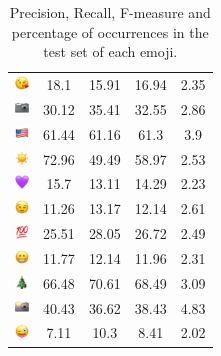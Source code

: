 \documentclass{article}
\begin{document}
\begin{table}
\begin{tabular}{|c|ccc|c|}
\includegraphics[height=0.37cm,width=0.37cm]{img/face_blowing_a_kiss.png} & 18.1 & 15.91 & 16.94 & 2.35\\ 
\includegraphics[height=0.37cm,width=0.37cm]{img/camera.png} & 30.12 & 35.41 & 32.55 & 2.86\\ 
\includegraphics[height=0.37cm,width=0.37cm]{img/United_States.png} & 61.44 & 61.16 & 61.3 & 3.9\\ 
\includegraphics[height=0.37cm,width=0.37cm]{img/sun.png} & 72.96 & 49.49 & 58.97 & 2.53\\ 
\includegraphics[height=0.37cm,width=0.37cm]{img/purple_heart.png} & 15.7 & 13.11 & 14.29 & 2.23\\ 
\includegraphics[height=0.37cm,width=0.37cm]{img/winking_face.png} & 11.26 & 13.17 & 12.14 & 2.61\\ 
\includegraphics[height=0.37cm,width=0.37cm]{img/hundred_points.png} & 25.51 & 28.05 & 26.72 & 2.49\\ 
\includegraphics[height=0.37cm,width=0.37cm]{img/beaming_face_with_smiling_eyes.png} & 11.77 & 12.14 & 11.96 & 2.31\\ 
\includegraphics[height=0.37cm,width=0.37cm]{img/Christmas_tree.png} & 66.48 & 70.61 & 68.49 & 3.09\\ 
\includegraphics[height=0.37cm,width=0.37cm]{img/camera_with_flash.png} & 40.43 & 36.62 & 38.43 & 4.83\\ 
\includegraphics[height=0.37cm,width=0.37cm]{img/winking_face_with_tongue.png} & 7.11 & 10.3 & 8.41 & 2.02\\ 

\hline
\end{tabular}
\caption{\label{table:emoji_detailed} Precision, Recall, F-measure and percentage of occurrences in the test set of each emoji.}
\end{table}
\end{document}
